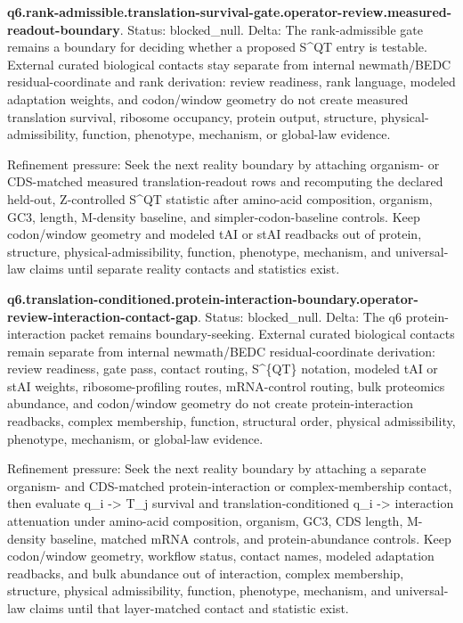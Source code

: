 \textbf{q6.rank-admissible.translation-survival-gate.operator-review.measured-readout-boundary}. Status: blocked\_null. Delta: The rank-admissible gate remains a boundary for deciding whether a proposed S\textasciicircum{}QT entry is testable. External curated biological contacts stay separate from internal newmath/BEDC residual-coordinate and rank derivation: review readiness, rank language, modeled adaptation weights, and codon/window geometry do not create measured translation survival, ribosome occupancy, protein output, structure, physical-admissibility, function, phenotype, mechanism, or global-law evidence.

Refinement pressure: Seek the next reality boundary by attaching organism- or CDS-matched measured translation-readout rows and recomputing the declared held-out, Z-controlled S\textasciicircum{}QT statistic after amino-acid composition, organism, GC3, length, M-density baseline, and simpler-codon-baseline controls. Keep codon/window geometry and modeled tAI or stAI readbacks out of protein, structure, physical-admissibility, function, phenotype, mechanism, and universal-law claims until separate reality contacts and statistics exist.

\textbf{q6.translation-conditioned.protein-interaction-boundary.operator-review-interaction-contact-gap}. Status: blocked\_null. Delta: The q6 protein-interaction packet remains boundary-seeking. External curated biological contacts remain separate from internal newmath/BEDC residual-coordinate derivation: review readiness, gate pass, contact routing, S\textasciicircum{}\{QT\} notation, modeled tAI or stAI weights, ribosome-profiling routes, mRNA-control routing, bulk proteomics abundance, and codon/window geometry do not create protein-interaction readbacks, complex membership, function, structural order, physical admissibility, phenotype, mechanism, or global-law evidence.

Refinement pressure: Seek the next reality boundary by attaching a separate organism- and CDS-matched protein-interaction or complex-membership contact, then evaluate q\_i -> T\_j survival and translation-conditioned q\_i -> interaction attenuation under amino-acid composition, organism, GC3, CDS length, M-density baseline, matched mRNA controls, and protein-abundance controls. Keep codon/window geometry, workflow status, contact names, modeled adaptation readbacks, and bulk abundance out of interaction, complex membership, structure, physical admissibility, function, phenotype, mechanism, and universal-law claims until that layer-matched contact and statistic exist.

